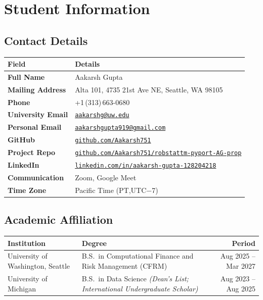 \documentclass[11pt, a4paper]{article}
\begin{document}
\section{Student Information}

\subsection{Contact Details}

\renewcommand{\arraystretch}{1.25}
\begin{tabularx}{\linewidth}{@{} >{\bfseries}l X @{}}
  \toprule
  Field            & Details \\
  \midrule
  Full Name        & Aakarsh Gupta \\
  Mailing Address  & Alta 101, 4735 21st Ave NE, Seattle, WA 98105 \\
  Phone            & +1\,(313)\,663-0680 \\
  University Email & \href{mailto:aakarshg@uw.edu}{\texttt{aakarshg@uw.edu}} \\
  Personal Email   & \href{mailto:aakarshgupta919@gmail.com}
                        {\texttt{aakarshgupta919@gmail.com}} \\
  GitHub           & \href{https://github.com/Aakarsh751}
                        {\texttt{github.com/Aakarsh751}} \\
  Project Repo     & \href{https://github.com/Aakarsh751/robstattm-pyport-AG-prop}
                        {\texttt{github.com/Aakarsh751/robstattm-pyport-AG-prop}} \\
  LinkedIn         & \href{https://linkedin.com/in/aakarsh-gupta-128204218/}
                        {\texttt{linkedin.com/in/aakarsh-gupta-128204218}} \\
  Communication    & Zoom, Google Meet \\
  Time Zone        & Pacific Time (PT,\;UTC$-$7) \\
  \bottomrule
\end{tabularx}
\renewcommand{\arraystretch}{1}

\subsection{Academic Affiliation}

\begin{tabularx}{\linewidth}{@{} l X r @{}}
  \toprule
  \textbf{Institution} & \textbf{Degree} & \textbf{Period} \\
  \midrule
  University of Washington, Seattle
    & B.S.\ in Computational Finance and Risk Management (CFRM)
    & Aug 2025 -- Mar 2027 \\[4pt]
  University of Michigan
    & B.S.\ in Data Science \textit{(Dean's List; International Undergraduate Scholar)}
    & Aug 2023 -- Aug 2025 \\
  \bottomrule
\end{tabularx}
\end{document}
